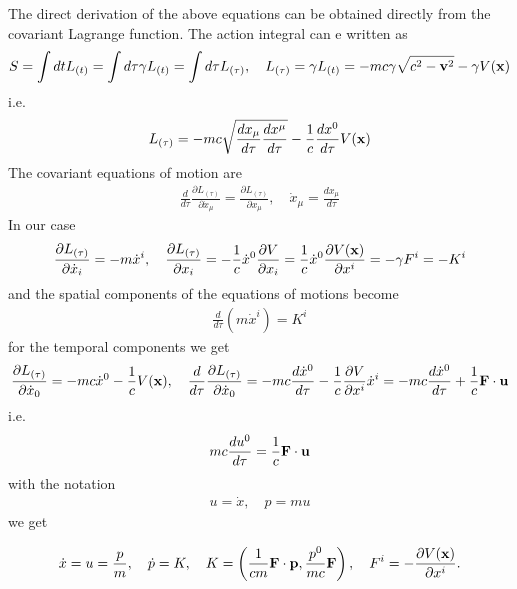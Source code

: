 The direct derivation of the above equations can be obtained directly from the covariant Lagrange function. The action integral can e written as
\begin{align}
  S = \int dt L_{(t)}=\int d\tau\gamma L_{(t)}=\int d\tau L_{(\tau)},\quad L_{(\tau)} = \gamma L_{(t)} = -mc\gamma\sqrt{c^2 - {\bf v}^2}-\gamma V({\bf x})
\end{align}
i.e.
\begin{align}
  L_{(\tau)}= -mc\sqrt{\frac{dx_{\mu}}{d\tau}\frac{dx^{\mu}}{d\tau}} - \frac 1c \frac{dx^0}{d\tau} V({\bf x})
\end{align}
The covariant equations of motion are
\begin{align}
  \frac{d}{d\tau}\frac{\partial L_{(\tau)}}{\partial \dot x_\mu}=\frac{\partial L_{(\tau)}}{\partial x_{\mu}},\quad \dot x_{\mu}=\frac{dx_{\mu}}{d\tau}
\end{align}
In our case
\begin{align}
  \frac{\partial L_{(\tau)}}{\partial \dot x_i}=-m\dot x^i,\quad \frac{\partial L_{(\tau)}}{\partial x_i}=-\frac1c \dot x^0\frac{\partial V}{\partial x_i}=\frac1c \dot x^0\frac{\partial V({\bf x})}{\partial x^i}=-\gamma F^i = -K^i
\end{align}
and the spatial components of the equations of motions become
\begin{align}
  \frac{d}{d\tau}(m\dot x^i) =K ^i
\end{align}
for the temporal components we get
\begin{align}
  \frac{\partial L_{(\tau)}}{\partial \dot x_0}=-mc\dot x^0-\frac1c V({\bf x}), \quad \frac{d}{d\tau}\frac{\partial L_{(\tau)}}{\partial \dot x_0}=-mc\frac{d\dot x^0}{d\tau}-\frac1c\frac{\partial V}{\partial x^i}\dot x^i=-mc\frac{d\dot x^0}{d\tau}+\frac1c{\bf F}\cdot{\bf u}
\end{align}
i.e.
\begin{align}
  mc\frac{du^0}{d\tau} = \frac1c{\bf F}\cdot{\bf u}
\end{align}
with the notation
\begin{align}
  u=\dot x,\quad p  = mu
\end{align}
we get
\begin{importantbox}
  \begin{align}
    \dot x = u = \frac{p}{m},\quad \dot p = K,\quad
    K = \left(\frac1{cm}{\bf F}\cdot {\bf p},\frac{p^0}{mc}{\bf F}\right),\quad
    F^i = -\frac{\partial V({\bf x})}{\partial x^i}.
  \end{align}
\end{importantbox}

